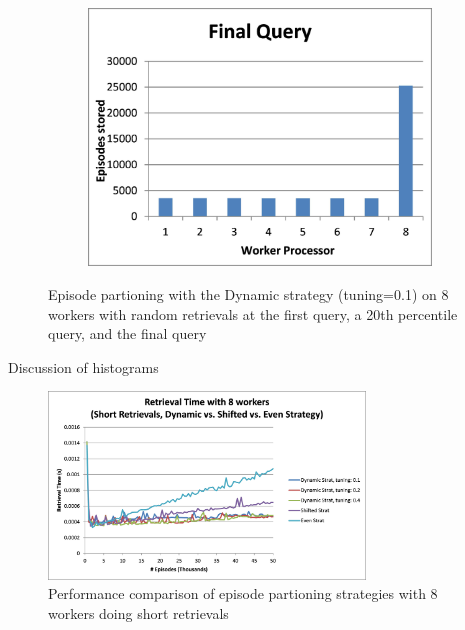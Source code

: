 \documentclass[11pt]{article} %
\begin{document}
\begin{figure}
\begin{subfigure}[b]{0.33\textwidth}
        \end{subfigure}%
        \begin{subfigure}[b]{0.33\textwidth}
                \centering
                \includegraphics[width=\textwidth]{images/randfinalquery}
                \label{fig:randdynam3}
        \end{subfigure}
        \caption{Episode partioning with the Dynamic strategy (tuning=0.1) on 8 workers with random retrievals at the first query, a 20th percentile query, and the final query}\label{fig:randdynam}
\end{figure}

Discussion of histograms

\begin{figure}[h]
\caption{Performance comparison of episode partioning strategies with 8 workers doing short retrievals}\label{fig:shortdynamcomp}
\centering
\includegraphics[width=0.75\textwidth]{images/alldynamicshort}
\end{figure}
\end{document}
